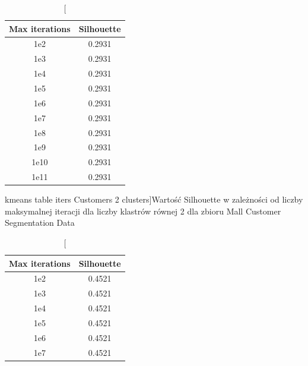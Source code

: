\documentclass{classrep}
\begin{document}
{{            \begin{table}[!htbp]
                \begin{minipage}{.48\textwidth}
                    \centering
                    \begin{tabular}{|c|c|}
                        \hline
                        Max iterations & Silhouette \\ \hline
                        1e2 & 0.2931 \\ \hline
                        1e3 & 0.2931 \\ \hline
                        1e4 & 0.2931 \\ \hline
                        1e5 & 0.2931 \\ \hline
                        1e6 & 0.2931 \\ \hline
                        1e7 & 0.2931 \\ \hline
                        1e8 & 0.2931 \\ \hline
                        1e9 & 0.2931 \\ \hline
                        1e10 & 0.2931 \\ \hline
                        1e11 & 0.2931 \\ \hline
                    \end{tabular}
                    \caption
                    [kmeans table iters Customers 2 clusters]{Wartość Silhouette w
                    zależności od liczby maksymalnej iteracji dla liczby klastrów
                    równej 2 dla zbioru Mall Customer Segmentation Data}
                    \label{kmeans_table_iters_Customers_2_clusters}
                \end{minipage}
                \hfill
                \begin{minipage}{.48\textwidth}
                    \centering
                    \begin{tabular}{|c|c|}
                        \hline
                        Max iterations & Silhouette \\ \hline
                        1e2 & 0.4521 \\ \hline
                        1e3 & 0.4521 \\ \hline
                        1e4 & 0.4521 \\ \hline
                        1e5 & 0.4521 \\ \hline
                        1e6 & 0.4521 \\ \hline
                        1e7 & 0.4521 \\ \hline

\end{tabular}
\end{minipage}
\end{table}}}
\end{document}
